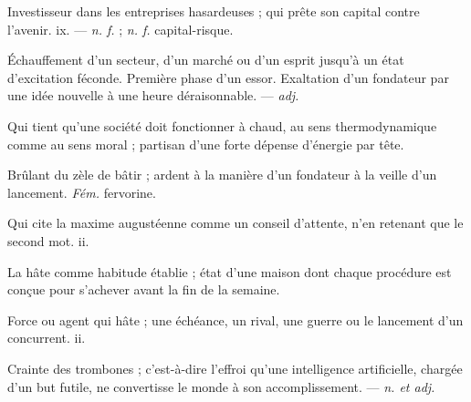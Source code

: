  Investisseur dans les entreprises hasardeuses ; qui prête son capital contre l'avenir.   ix. ---  \textit{n. f.} ;  \textit{n. f.} capital-risque.

 Échauffement d'un secteur, d'un marché ou d'un esprit jusqu'à un état d'excitation féconde.  Première phase d'un essor.  Exaltation d'un fondateur par une idée nouvelle à une heure déraisonnable. ---  \textit{adj.}

 Qui tient qu'une société doit fonctionner à chaud, au sens thermodynamique comme au sens moral ; partisan d'une forte dépense d'énergie par tête.

 Brûlant du zèle de bâtir ; ardent à la manière d'un fondateur à la veille d'un lancement. \textit{Fém.} fervorine.

 Qui cite la maxime augustéenne comme un conseil d'attente, n'en retenant que le second mot.   ii.

 La hâte comme habitude établie ; état d'une maison dont chaque procédure est conçue pour s'achever avant la fin de la semaine.

 Force ou agent qui hâte ; une échéance, un rival, une guerre ou le lancement d'un concurrent.   ii.

 Crainte des trombones ; c'est-à-dire l'effroi qu'une intelligence artificielle, chargée d'un but futile, ne convertisse le monde à son accomplissement.   ---  \textit{n. et adj.}

